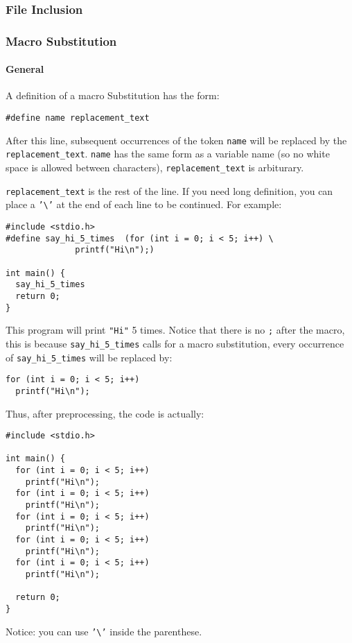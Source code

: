 \documentclass[11pt]{article}
\begin{document}
\subsubsection{File Inclusion}
\label{sec:org26ff7a9}
\subsubsection{Macro Substitution}
\label{sec:org3c54c1a}
\paragraph{General}
\label{sec:orgae411fa}
A definition of a macro Substitution has the form:
\begin{verbatim}
#define name replacement_text
\end{verbatim}
After this line, subsequent occurrences of the token \texttt{name} will be replaced by the \texttt{replacement\_text}. \texttt{name} has the same form as a variable name (so no white space is allowed between characters), \texttt{replacement\_text} is arbiturary.

\texttt{replacement\_text} is the rest of the line. If you need long definition, you can place a \texttt{'\textbackslash{}'} at the end of each line to be continued. For example:
\begin{verbatim}
#include <stdio.h>
#define say_hi_5_times  (for (int i = 0; i < 5; i++) \
			  printf("Hi\n");)

int main() {
  say_hi_5_times
  return 0;
}
\end{verbatim}
This program will print \texttt{"Hi"} 5 times. Notice that there is no \texttt{;} after the macro, this is because \texttt{say\_hi\_5\_times} calls for a macro substitution, every occurrence of \texttt{say\_hi\_5\_times} will be replaced by:
\begin{verbatim}
for (int i = 0; i < 5; i++)
  printf("Hi\n");
\end{verbatim}
Thus, after preprocessing, the code is actually:
\begin{verbatim}
#include <stdio.h>

int main() {
  for (int i = 0; i < 5; i++)
    printf("Hi\n");
  for (int i = 0; i < 5; i++)
    printf("Hi\n");
  for (int i = 0; i < 5; i++)
    printf("Hi\n");
  for (int i = 0; i < 5; i++)
    printf("Hi\n");
  for (int i = 0; i < 5; i++)
    printf("Hi\n");

  return 0;
}
\end{verbatim}
Notice: you can use \texttt{'\textbackslash{}'} inside the parenthese.
\end{document}
